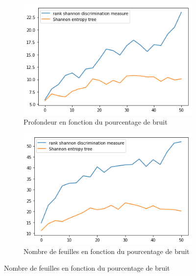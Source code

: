\documentclass[a4paper]{article}
\begin{document}
\begin{figure}[H]
    \begin{subfigure}[c]{0.46\textwidth}
        \centering
        \includegraphics[width=\textwidth]{images/depth_3.png}
        \caption{Profondeur en fonction du pourcentage de bruit}
    \label{subresults:depth3}
    \end{subfigure}
    \begin{subfigure}[c]{0.46\textwidth}
        \centering
        \includegraphics[width=\textwidth]{images/leaves_3.png}
        \caption{Nombre de feuilles en fonction du pourcentage de bruit}
    \label{subresults:leaves3}
    \end{subfigure}


\end{figure}
\end{document}
